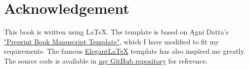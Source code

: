 \chapter*{Acknowledgement}
This book is written using \LaTeX. The template is based on Agni Datta's \href{https://www.overleaf.com/latex/templates/preprint-book-manuscript-template/ghrbwppzhzjx}{"Preprint Book Manuscript Template"}, which I have modified to fit my requirements. 
The famous \href{https://github.com/ElegantLaTeX/ElegantLaTeX}{ElegantLaTeX} template has also inspired me greatly. The source code is available in \href{https://github.com/guo-zhenran/Maths-for-Economists}{my GitHub repository} for reference.

